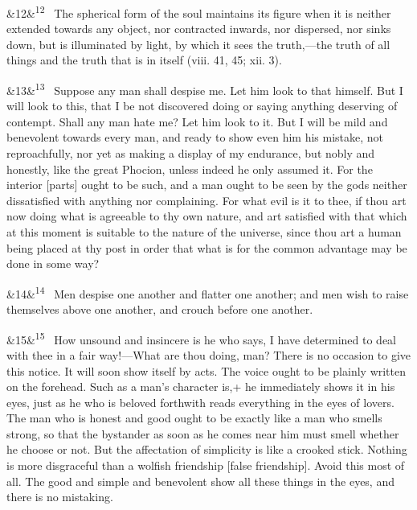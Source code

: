 \documentclass[12pt]{article}
\newcommand{\para}[1][]{\par\noindent\ifx&#1&\else\textsuperscript{\footnotesize #1}~\fi}
\begin{document}
\para[12] The spherical form of the soul maintains its figure when it is
neither extended towards any object, nor contracted inwards, nor
dispersed, nor sinks down, but is illuminated by light, by which it sees
the truth,---the truth of all things and the truth that is in itself
(viii. 41, 45; xii. 3).

\para[13] Suppose any man shall despise me. Let him look to that himself. But
I will look to this, that I be not discovered doing or saying anything
deserving of contempt. Shall any man hate me? Let him look to it. But I
will be mild and benevolent towards every man, and ready to show even
him his mistake, not reproachfully, nor yet as making a display of my
endurance, but nobly and honestly, like the great Phocion, unless indeed
he only assumed it. For the interior [parts] ought to be such, and a
man ought to be seen by the gods neither dissatisfied with anything nor
complaining. For what evil is it to thee, if thou art now doing what is
agreeable to thy own nature, and art satisfied with that which at this
moment is suitable to the nature of the universe, since thou art a human
being placed at thy post in order that what is for the common advantage
may be done in some way?

\para[14] Men despise one another and flatter one another; and men wish to
raise themselves above one another, and crouch before one another.

\para[15] How unsound and insincere is he who says, I have determined to deal
with thee in a fair way!---What are thou doing, man? There is no occasion
to give this notice. It will soon show itself by acts. The voice ought
to be plainly written on the forehead. Such as a man's character is,+ he
immediately shows it in his eyes, just as he who is beloved forthwith
reads everything in the eyes of lovers. The man who is honest and good
ought to be exactly like a man who smells strong, so that the bystander
as soon as he comes near him must smell whether he choose or not. But
the affectation of simplicity is like a crooked stick. Nothing is
more disgraceful than a wolfish friendship [false friendship]. Avoid
this most of all. The good and simple and benevolent show all these
things in the eyes, and there is no mistaking.
\end{document}
